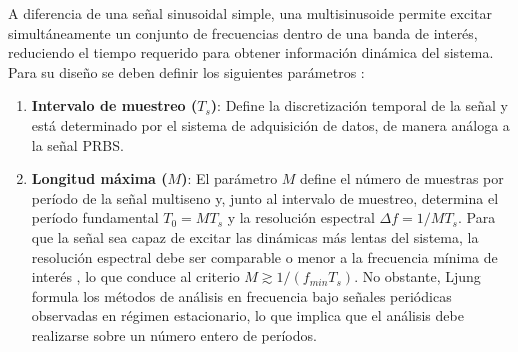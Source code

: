 \documentclass[11pt]{report}
\begin{document}
A diferencia de una señal sinusoidal simple, una multisinusoide permite excitar simultáneamente un conjunto de frecuencias dentro de una banda de interés, reduciendo el tiempo requerido para obtener información dinámica del sistema. 
Para su diseño se deben definir los siguientes parámetros \cite{ljung1999system}:
\begin{enumerate}

\item \textbf{Intervalo de muestreo ($T_s$)}: Define la discretización temporal de la señal y está determinado por el sistema de adquisición de datos, de manera análoga a la señal PRBS.
\item \textbf{Longitud máxima ($M$)}: El parámetro $M$ define el número de muestras por período de la señal multiseno y, junto al intervalo de muestreo, determina el período fundamental $T_0=MT_s$ y la resolución espectral $\Delta f=1/MT_s$. Para que la señal sea capaz de excitar las dinámicas más lentas del sistema, la resolución espectral debe ser comparable o menor a la frecuencia mínima de interés %
, lo que conduce al criterio $M\gtrsim 1/(f_{min}T_s)$. 
No obstante, Ljung formula los métodos de análisis en frecuencia bajo señales periódicas observadas en régimen estacionario, lo que implica que el análisis debe realizarse sobre un número entero de períodos. 





\end{enumerate}
\end{document}

